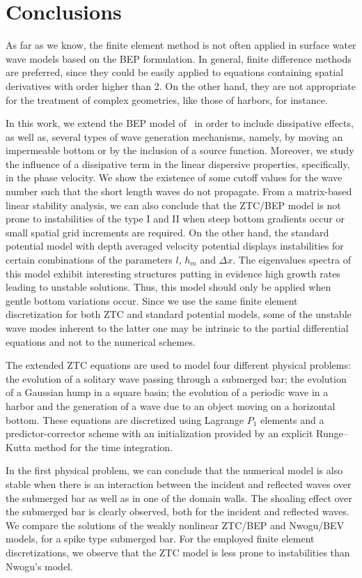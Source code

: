 \section{Conclusions}
As far as we know, the finite element method is not often
applied in surface water wave models based on the BEP
formulation.  In general, finite difference methods are
preferred, since they could be easily applied to equations
containing spatial derivatives with order higher than 2.  On
the other hand, they are not appropriate for the treatment
of complex geometries, like those of harbors, for instance.

In this work, we extend the BEP model
of~\cite{ZhaoTengCheng2004} in order to include dissipative
effects, as well as, several types of wave generation
mechanisms, namely, by moving an impermeable bottom or by
the inclusion of a source function.  Moreover, we study the
influence of a dissipative term in the linear dispersive
properties, specifically, in the phase velocity.  We show
the existence of some cutoff values for the wave number such
that the short length waves do not propagate.  From a
matrix-based linear stability analysis, we can also conclude
that the ZTC/BEP model is not prone to instabilities of the
type I and II when steep bottom gradients occur or small
spatial grid increments are required.  On the other hand, the
standard potential model with depth averaged velocity
potential displays instabilities for certain combinations of
the parameters $l$, $h_m$ and $\Delta x$. The eigenvalues
spectra of this model exhibit interesting structures
putting in evidence high growth rates leading to unstable
solutions. Thus, this model should only be applied when
gentle bottom variations occur.  Since we use the same
finite element discretization for both ZTC and standard
potential models, some of the unstable wave modes  inherent
to the latter one may be intrinsic to the partial differential
equations and not to the numerical schemes.


The extended ZTC equations are used to model four different
physical problems: the evolution of a solitary wave passing
through a submerged bar; the evolution of a Gaussian hump in
a square basin; the evolution of a periodic wave in a harbor
and the generation of a wave due to an object moving on a
horizontal bottom.  These equations are discretized using
Lagrange $P_1$ elements and a predictor-corrector scheme
with an initialization provided by an explicit Runge--Kutta
method for the time integration.

In the first physical
problem, we can conclude that the numerical model is also
stable when there is an interaction between the incident and
reflected waves over the submerged bar as well as in one of
the domain walls. The shoaling effect over the submerged bar
is clearly observed, both for the incident and reflected
waves.  We compare the solutions of the weakly nonlinear
ZTC/BEP and Nwogu/BEV models, for a spike type submerged
bar.  For the employed finite element discretizations, we
observe that the ZTC model is less prone to instabilities
than Nwogu's model.

